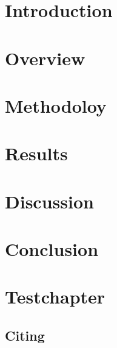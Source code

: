 \documentclass[a4paper, english]{ttlab-qualify}
\begin{document}
    \cleardoubleoddpage


    \chapter{Introduction}
    

    \chapter{Overview}
    \label{ch:overview}
    


    \chapter{Methodoloy}
    \label{ch:methodology}
    


    \chapter{Results}
    \label{ch:results}


    \chapter{Discussion}
    \label{ch:discussion}

    \chapter{Conclusion}
    \label{ch:conclusion}

    \chapter{\latex Testchapter}
    \section{Citing}
    ~\cite{GERPARCOR}
\end{document}
